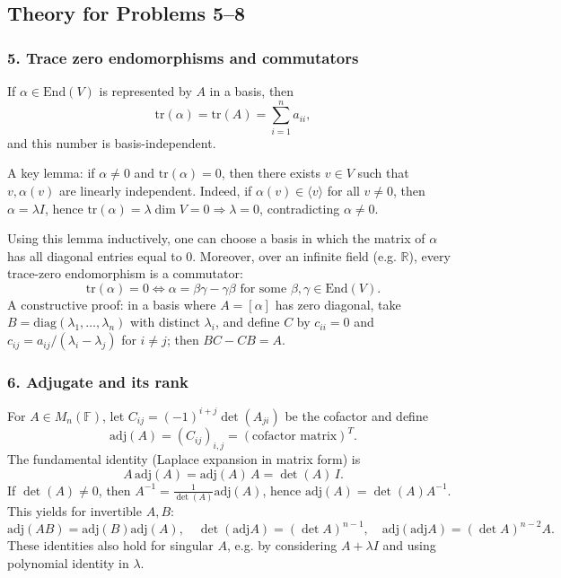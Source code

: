 \documentclass[12pt,a4paper]{article}
\theoremstyle{plain}
\theoremstyle{definition}      %
\begin{document}
\subsection*{Theory for Problems 5--8}

\subsubsection*{5. Trace zero endomorphisms and commutators}
If \(\alpha\in\mathrm{End}(V)\) is represented by \(A\) in a basis, then
\[
\mathrm{tr}(\alpha)=\mathrm{tr}(A)=\sum_{i=1}^n a_{ii},
\]
and this number is basis-independent.

A key lemma: if \(\alpha\neq0\) and \(\mathrm{tr}(\alpha)=0\), then there exists \(v\in V\) such that
\(v,\alpha(v)\) are linearly independent. Indeed, if \(\alpha(v)\in\langle v\rangle\) for all \(v\neq0\),
then \(\alpha=\lambda I\), hence \(\mathrm{tr}(\alpha)=\lambda\dim V=0\Rightarrow \lambda=0\), contradicting \(\alpha\neq0\).

Using this lemma inductively, one can choose a basis in which the matrix of \(\alpha\) has all diagonal entries equal to \(0\).
Moreover, over an infinite field (e.g. \(\mathbb R\)), every trace-zero endomorphism is a commutator:
\[
\mathrm{tr}(\alpha)=0 \iff \alpha=\beta\gamma-\gamma\beta \text{ for some }\beta,\gamma\in\mathrm{End}(V).
\]
A constructive proof: in a basis where \(A=[\alpha]\) has zero diagonal, take \(B=\mathrm{diag}(\lambda_1,\dots,\lambda_n)\) with
distinct \(\lambda_i\), and define \(C\) by \(c_{ii}=0\) and \(c_{ij}=a_{ij}/(\lambda_i-\lambda_j)\) for \(i\neq j\); then \(BC-CB=A\).

\subsubsection*{6. Adjugate and its rank}
For \(A\in M_n(\mathbb F)\), let \(C_{ij}=(-1)^{i+j}\det(A_{ji})\) be the cofactor and define
\[
\mathrm{adj}(A)=(C_{ij})_{i,j}=(\text{cofactor matrix})^T.
\]
The fundamental identity (Laplace expansion in matrix form) is
\[
A\,\mathrm{adj}(A)=\mathrm{adj}(A)\,A=\det(A)\,I.
\]
If \(\det(A)\neq0\), then \(A^{-1}=\frac{1}{\det(A)}\mathrm{adj}(A)\), hence \(\mathrm{adj}(A)=\det(A)A^{-1}\).
This yields for invertible \(A,B\):
\[
\mathrm{adj}(AB)=\mathrm{adj}(B)\mathrm{adj}(A),\quad
\det(\mathrm{adj}A)=(\det A)^{n-1},\quad
\mathrm{adj}(\mathrm{adj}A)=(\det A)^{n-2}A.
\]
These identities also hold for singular \(A\), e.g. by considering \(A+\lambda I\) and using polynomial identity in \(\lambda\).
\end{document}
